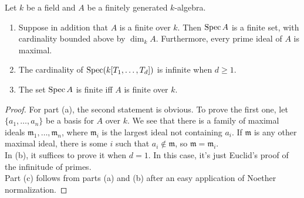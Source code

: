\begin{exer}
	Let $k$ be a field and $A$ be a finitely generated $k$-algebra.
	\begin{enumerate}[label=(\alph*)]
		\item Suppose in addition that $A$ is a finite over $k$.
			Then $\operatorname{Spec} A$ is a finite set, with cardinality
			bounded above by $\dim_k A$. Furthermore, every prime
			ideal of $A$ is maximal.
		\item The cardinality of $\operatorname{Spec}(k[T_1,\ldots,T_d])$ is infinite
			when $d \geq 1$.
		\item The set $\operatorname{Spec} A$ is finite iff $A$ is finite over $k$.
	\end{enumerate}
\end{exer}
\begin{proof}
	For part (a), the second statement is obvious. To prove the first one,
	let $\{a_1,\ldots,a_n\}$ be a basis for $A$ over $k$. We see that there
	is a family of maximal ideals $\mathfrak m_1,\ldots,\mathfrak m_n$,
	where $\mathfrak m_i$ is the largest ideal not containing $a_i$. If
	$\mathfrak m$ is any other maximal ideal, there is some $i$ such that
	$a_i \not\in \mathfrak m$, so $\mathfrak m = \mathfrak m_i$.\\

	In (b), it suffices to prove it when $d = 1$. In this case, it's just
	Euclid's proof of the infinitude of primes.\\

	Part (c) follows from parts (a) and (b) after an easy application of
	Noether normalization.
\end{proof}

